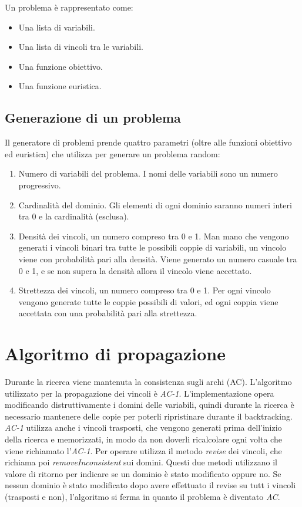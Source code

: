 \documentclass[a4paper,12pt,italian]{article}
\begin{document}
Un problema \`e rappresentato come:

\begin{itemize}
\item Una lista di variabili.
\item Una lista di vincoli tra le variabili.
\item Una funzione obiettivo.
\item Una funzione euristica.
\end{itemize}

\subsection{Generazione di un problema}

Il generatore di problemi prende quattro parametri (oltre alle
funzioni obiettivo ed euristica) che utilizza per generare un problema
random:

\begin{enumerate}
\item Numero di variabili del problema. I nomi delle variabili sono un
  numero progressivo.
\item Cardinalit\`a del dominio. Gli elementi di ogni dominio saranno
  numeri interi tra 0 e la cardinalit\`a (esclusa).
\item Densit\`a dei vincoli, un numero compreso tra 0 e 1. Man mano che vengono generati i vincoli
  binari tra tutte le possibili coppie di variabili, un vincolo viene
  con probabilit\`a pari alla densit\`a. Viene generato un numero
  casuale tra 0 e 1, e se non supera la densit\`a allora il vincolo
  viene accettato.
\item Strettezza dei vincoli, un numero compreso tra 0 e 1. Per ogni
  vincolo vengono generate tutte le coppie possibili di valori, ed
  ogni coppia viene accettata con una probabilit\`a pari alla
  strettezza.
\end{enumerate}

\section{Algoritmo di propagazione}

Durante la ricerca viene mantenuta la consistenza sugli archi
(AC). L'algoritmo utilizzato per la propagazione dei vincoli \`e
\textit{AC-1}. L'implementazione opera modificando distruttivamente i
domini delle variabili, quindi durante la ricerca \`e necessario
mantenere delle copie per poterli ripristinare durante il
backtracking. \textit{AC-1} utilizza anche i vincoli trasposti, che
vengono generati prima dell'inizio della ricerca e memorizzati, in
modo da non doverli ricalcolare ogni volta che viene richiamato l'\textit{AC-1}.
Per operare utilizza il metodo \textit{revise} dei vincoli, che
richiama poi \textit{removeInconsistent} sui domini. Questi due metodi
utilizzano il valore di ritorno per indicare se un dominio \`e stato
modificato oppure no. Se nessun dominio \`e stato modificato dopo
avere effettuato il revise su tutt i vincoli (trasposti e non),
l'algoritmo si ferma in quanto il problema \`e diventato \textit{AC}.
\end{document}
